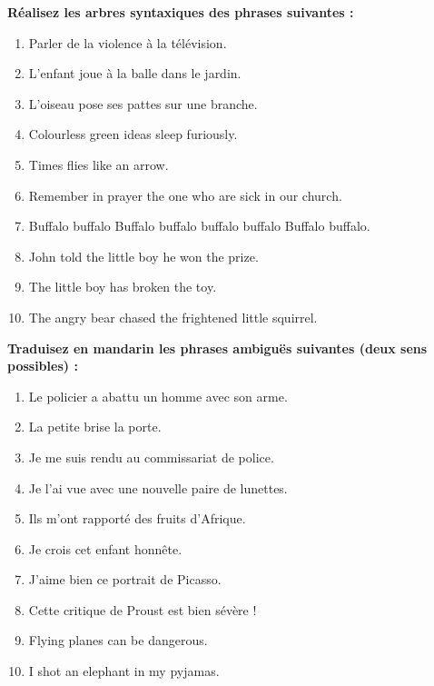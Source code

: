 \begin{keybox}[II]
\textbf{Réalisez les arbres syntaxiques des phrases suivantes :}
\begin{enumerate}
\item Parler de la violence à la télévision.
\item L’enfant joue à la balle dans le jardin.
\item L’oiseau pose ses pattes sur une branche.
\item Colourless green ideas sleep furiously.
\item Times flies like an arrow.
\item Remember in prayer the one who are sick in our church.
\item Buffalo buffalo Buffalo buffalo buffalo buffalo Buffalo buffalo.
\item John told the little boy he won the prize.
\item The little boy has broken the toy.
\item The angry bear chased the frightened little squirrel.
\end{enumerate}
\end{keybox}

\begin{keybox}[III]
\textbf{Traduisez en mandarin les phrases ambiguës suivantes (deux sens possibles) :}
\begin{enumerate}
\item Le policier a abattu un homme avec son arme.
\item La petite brise la porte.
\item Je me suis rendu au commissariat de police.
\item Je l’ai vue avec une nouvelle paire de lunettes.
\item Ils m’ont rapporté des fruits d’Afrique.
\item Je crois cet enfant honnête.
\item J’aime bien ce portrait de Picasso.
\item Cette critique de Proust est bien sévère !
\item Flying planes can be dangerous.
\item I shot an elephant in my pyjamas.
\end{enumerate}
\end{keybox}


